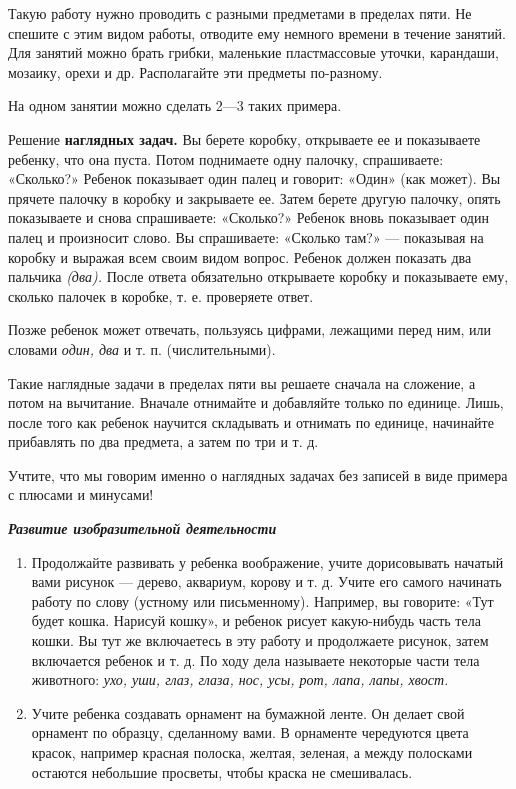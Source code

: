 \documentclass{book}
\renewcommand{\emph}[1]{\textit{#1}}
\begin{document}
Такую работу нужно проводить с разными предметами в пределах пяти. Не
спешите с этим видом работы, отводите ему немного времени в течение
занятий. Для занятий можно брать грибки, маленькие пластмассовые уточки,
карандаши, мозаику, орехи и др. Располагайте эти предметы по-разному.

На одном занятии можно сделать 2---3 таких примера.

Решение \textbf{наглядных задач.} Вы берете коробку, открываете ее и
показываете ребенку, что она пуста. Потом поднимаете одну палочку,
спрашиваете: «Сколько?» Ребенок показывает один палец и говорит: «Один»
(как может). Вы прячете палочку в коробку и закрываете ее. Затем берете
другую палочку, опять показываете и снова спрашиваете: «Сколько?»
Ребенок вновь показывает один палец и произносит слово. Вы спрашиваете:
«Сколько там?» --- показывая на коробку и выражая всем своим видом
вопрос. Ребенок должен показать два пальчика \emph{(два).} После ответа
обязательно открываете коробку и показываете ему, сколько палочек в
коробке, т. е. проверяете ответ.

Позже ребенок может отвечать, пользуясь цифрами, лежащими перед ним, или
словами \emph{один, два} и т. п. (числительными).

Такие наглядные задачи в пределах пяти вы решаете сначала на сложение, а
потом на вычитание. Вначале отнимайте и добавляйте только по единице.
Лишь, после того как ребенок научится складывать и отнимать по единице,
начинайте прибавлять по два предмета, а затем по три и т. д.

Учтите, что мы говорим именно о наглядных задачах без записей в виде
примера с плюсами и минусами!

\emph{\textbf{Развитие изобразительной деятельности}}


\begin{enumerate}
\def\labelenumi{\arabic{enumi}.}
\item
  
  Продолжайте развивать у ребенка воображение, учите дорисовывать
  начатый вами рисунок --- дерево, аквариум, корову и т. д. Учите его
  самого начинать работу по слову (устному или письменному). Например,
  вы говорите: «Тут будет кошка. Нарисуй кошку», и ребенок рисует
  какую-нибудь часть тела кошки. Вы тут же включаетесь в эту работу и
  продолжаете рисунок, затем включается ребенок и т. д. По ходу дела
  называете некоторые части тела животного: \emph{ухо, уши, глаз, глаза,
  нос, усы, рот, лапа, лапы, хвост.}
  
\item
  
  Учите ребенка создавать орнамент на бумажной ленте. Он делает свой
  орнамент по образцу, сделанному вами. В орнаменте чередуются цвета
  красок, например красная полоска, желтая, зеленая, а между полосками
  остаются небольшие просветы, чтобы краска не смешивалась.
  
\end{enumerate}
\end{document}
